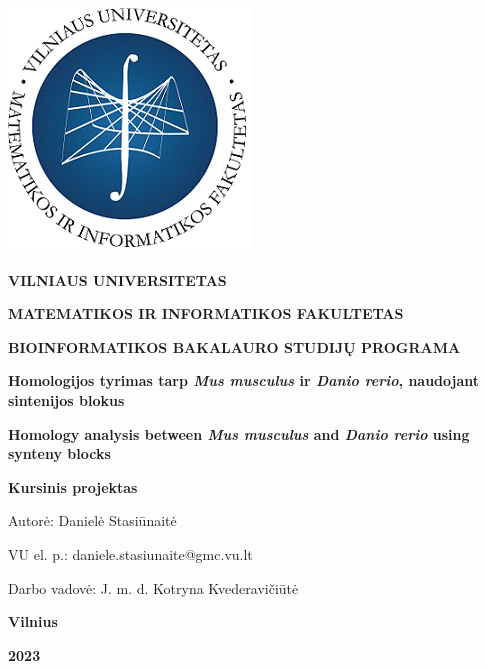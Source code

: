 \documentclass[12pt]{article}
\begin{document}

\begin{titlepage}
\vskip 20pt
\begin{center}
\includegraphics[scale=0.5]{MIF}
\end{center}


\vskip 20pt
\centerline{\bf \large \textbf{VILNIAUS UNIVERSITETAS}}
\bigskip
\centerline{\large \textbf{MATEMATIKOS IR INFORMATIKOS FAKULTETAS}}
\bigskip
\centerline{\large \textbf{BIOINFORMATIKOS BAKALAURO STUDIJŲ PROGRAMA}}

\vskip 90pt
\begin{center}
    {\bf \LARGE Homologijos tyrimas tarp \emph{Mus musculus} ir
    \emph{Danio rerio}, naudojant sintenijos blokus}
\end{center}
\begin{center}
    {\bf \Large Homology analysis between \emph{Mus musculus} and
    \emph{Danio rerio} using synteny blocks}
\end{center}
\vskip 20pt
\centerline{\bf \large \textbf{Kursinis projektas}}
\bigskip
\vskip 40pt

\hskip 140pt {\large Autorė: Danielė Stasiūnaitė}

\hskip 140pt{\large VU el. p.: daniele.stasiunaite@gmc.vu.lt}
\bigskip
\vskip 20pt

\hskip 140pt {\large Darbo vadovė: J. m. d. Kotryna Kvederavičiūtė}
\vskip 60pt
\vskip 40pt
\centerline{\large \textbf{Vilnius}}
\centerline{\large \textbf{2023}}
\newpage
\end{titlepage}



\tableofcontents
\newpage
\end{document}
